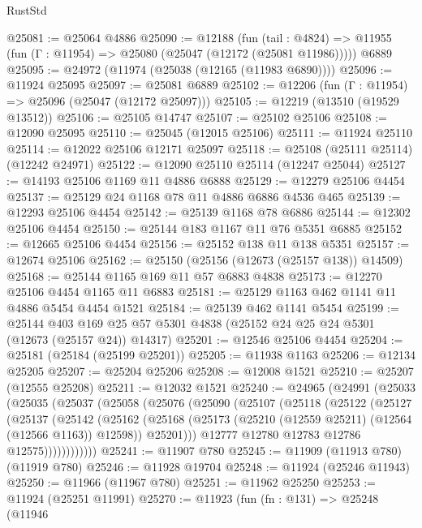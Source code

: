 \begin{lexlean}{RustStd}
\begin{coremodule}
{\begin{coremodule}
{{{{{{{{{{{{{{{{{{{{{{{{{{{{{{{{{{{{{{{{{{{{{{{{{{{{{{{{{{{{{{{{{{{{{{{{{{{{{{{{@25081 := @25064 @4886
@25090 := @12188
    (fun (tail : @4824) => @11955 (fun (Γ : @11954) => @25080 (@25047 (@12172 (@25081 @11986)))))
    @6889
@25095 := @24972 (@11974 (@25038 (@12165 (@11983 @6890))))
@25096 := @11924 @25095
@25097 := @25081 @6889
@25102 := @12206 (fun (Γ : @11954) => @25096 (@25047 (@12172 @25097)))
@25105 := @12219 (@13510 (@19529 @13512))
@25106 := @25105 @14747
@25107 := @25102 @25106
@25108 := @12090 @25095
@25110 := @25045 (@12015 @25106)
@25111 := @11924 @25110
@25114 := @12022 @25106 @12171 @25097
@25118 := @25108 (@25111 @25114) (@12242 @24971)
@25122 := @12090 @25110 @25114 (@12247 @25044)
@25127 := @14193 @25106 @1169 @11 @4886 @6888
@25129 := @12279 @25106 @4454
@25137 := @25129 @24 @1168 @78 @11 @4886 @6886 @4536 @465
@25139 := @12293 @25106 @4454
@25142 := @25139 @1168 @78 @6886
@25144 := @12302 @25106 @4454
@25150 := @25144 @183 @1167 @11 @76 @5351 @6885
@25152 := @12665 @25106 @4454
@25156 := @25152 @138 @11 @138 @5351
@25157 := @12674 @25106
@25162 := @25150 (@25156 (@12673 (@25157 @138)) @14509)
@25168 := @25144 @1165 @169 @11 @57 @6883 @4838
@25173 := @12270 @25106 @4454 @1165 @11 @6883
@25181 := @25129 @1163 @462 @1141 @11 @4886 @5454 @4454 @1521
@25184 := @25139 @462 @1141 @5454
@25199 := @25144
    @403
    @169
    @25
    @57
    @5301
    @4838
    (@25152 @24 @25 @24 @5301 (@12673 (@25157 @24)) @14317)
@25201 := @12546 @25106 @4454
@25204 := @25181 (@25184 (@25199 @25201))
@25205 := @11938 @1163
@25206 := @12134 @25205
@25207 := @25204 @25206
@25208 := @12008 @1521
@25210 := @25207 (@12555 @25208)
@25211 := @12032 @1521
@25240 := @24965
    (@24991
      (@25033
        (@25035
          (@25037
            (@25058
              (@25076
                (@25090
                  (@25107
                    (@25118
                      (@25122
                        (@25127
                          (@25137
                            (@25142
                              (@25162
                                (@25168
                                  (@25173 (@25210 (@12559 @25211) (@12564 (@12566 @1163)) @12598))
                                  @25201)))
                            @12777
                            @12780
                            @12783
                            @12786
                            @12575))))))))))))
@25241 := @11907 @780
@25245 := @11909 (@11913 @780) (@11919 @780)
@25246 := @11928 @19704
@25248 := @11924 (@25246 @11943)
@25250 := @11966 (@11967 @780)
@25251 := @11962 @25250
@25253 := @11924 (@25251 @11991)
@25270 := @11923
    (fun (fn : @131) =>
    @25248
      (@11946
}}}}}}}}}}}}}}}}}}}}}}}}}}}}}}}}}}}}}}}}}}}}}}}}}}}}}}}}}}}}}}}}}}}}}}}}}}}}}}}}
\end{coremodule}}
\end{coremodule}
\end{lexlean}
